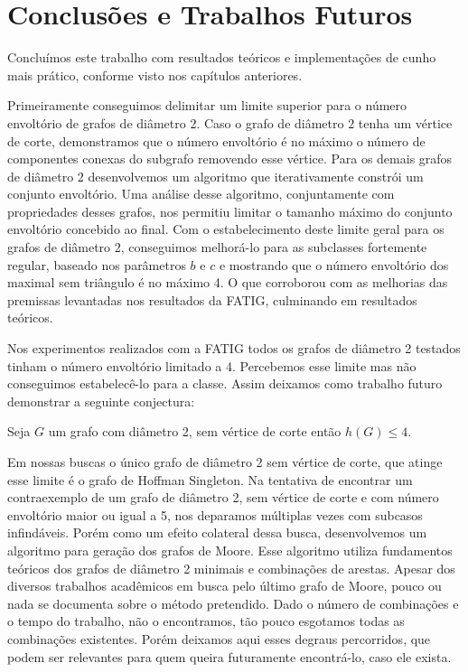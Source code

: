 \chapter{Conclusões e Trabalhos Futuros}
\label{sec:crono}

Concluímos este trabalho com resultados teóricos e implementações de cunho mais prático, conforme visto nos capítulos anteriores. 

Primeiramente conseguimos delimitar um limite superior para o número envoltório de grafos de diâmetro 2. Caso o grafo de diâmetro 2 tenha um vértice de corte, demonstramos que o número envoltório é no máximo o número de componentes conexas do subgrafo removendo esse vértice. Para os demais grafos de diâmetro 2 desenvolvemos um algoritmo que iterativamente constrói um conjunto envoltório. Uma análise desse algoritmo, conjuntamente com propriedades desses grafos, nos permitiu limitar o tamanho máximo do conjunto envoltório concebido ao final. Com o estabelecimento deste limite geral para os grafos de diâmetro 2, conseguimos melhorá-lo para as subclasses fortemente regular, baseado nos parâmetros $b$ e $c$ e mostrando que o número envoltório dos maximal sem triângulo é no máximo 4. O que corroborou com as melhorias das premissas levantadas nos resultados da FATIG, culminando em resultados teóricos.

Nos experimentos realizados com a FATIG todos os grafos de diâmetro 2 testados tinham o número envoltório limitado a 4. Percebemos esse limite mas não conseguimos estabelecê-lo para a classe. Assim deixamos como trabalho futuro demonstrar a seguinte conjectura: 

\begin{conjecture}
    Seja $G$ um grafo com diâmetro 2, sem vértice de corte então $h(G) \le 4$.
    \label{conjecture-d2-4}
\end{conjecture}
 
Em nossas buscas o único grafo de diâmetro 2 sem vértice de corte, que atinge esse limite é o grafo de Hoffman Singleton. 
Na tentativa de encontrar um contraexemplo de um grafo de diâmetro 2, sem vértice de corte e com número envoltório maior ou igual a 5, nos deparamos múltiplas vezes com subcasos infindáveis. Porém como um efeito colateral dessa busca, desenvolvemos um algoritmo para geração dos grafos de Moore. Esse algoritmo utiliza fundamentos teóricos dos grafos de diâmetro 2 minimais e combinações de arestas. Apesar dos diversos trabalhos acadêmicos em busca pelo último grafo de Moore, pouco ou nada se documenta sobre o método pretendido. Dado o número de combinações e o tempo do trabalho, não o encontramos, tão pouco esgotamos todas as combinações existentes. Porém deixamos aqui esses degraus percorridos, que podem ser relevantes para quem queira futuramente encontrá-lo, caso ele exista. 

